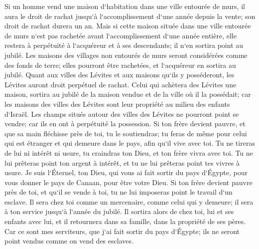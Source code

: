 \verse Si un homme vend une maison d`habitation dans une ville entourée de murs, il aura le droit de rachat jusqu`à l`accomplissement d`une année depuis la vente; son droit de rachat durera un an. 
\verse Mais si cette maison située dans une ville entourée de murs n`est pas rachetée avant l`accomplissement d`une année entière, elle restera à perpétuité à l`acquéreur et à ses descendants; il n`en sortira point au jubilé. 
\verse Les maisons des villages non entourés de murs seront considérées comme des fonds de terre; elles pourront être rachetées, et l`acquéreur en sortira au jubilé. 
\verse Quant aux villes des Lévites et aux maisons qu`ils y posséderont, les Lévites auront droit perpétuel de rachat. 
\verse Celui qui achètera des Lévites une maison, sortira au jubilé de la maison vendue et de la ville où il la possédait; car les maisons des villes des Lévites sont leur propriété au milieu des enfants d`Israël. 
\verse Les champs situés autour des villes des Lévites ne pourront point se vendre; car ils en ont à perpétuité la possession. 
\verse Si ton frère devient pauvre, et que sa main fléchisse près de toi, tu le soutiendras; tu feras de même pour celui qui est étranger et qui demeure dans le pays, afin qu`il vive avec toi. 
\verse Tu ne tireras de lui ni intérêt ni usure, tu craindras ton Dieu, et ton frère vivra avec toi. 
\verse Tu ne lui prêteras point ton argent à intérêt, et tu ne lui prêteras point tes vivres à usure. 
\verse Je suis l`Éternel, ton Dieu, qui vous ai fait sortir du pays d`Égypte, pour vous donner le pays de Canaan, pour être votre Dieu. 
\verse Si ton frère devient pauvre près de toi, et qu`il se vende à toi, tu ne lui imposeras point le travail d`un esclave. 
\verse Il sera chez toi comme un mercenaire, comme celui qui y demeure; il sera à ton service jusqu`à l`année du jubilé. 
\verse Il sortira alors de chez toi, lui et ses enfants avec lui, et il retournera dans sa famille, dans la propriété de ses pères. 
\verse Car ce sont mes serviteurs, que j`ai fait sortir du pays d`Égypte; ils ne seront point vendus comme on vend des esclaves. 
